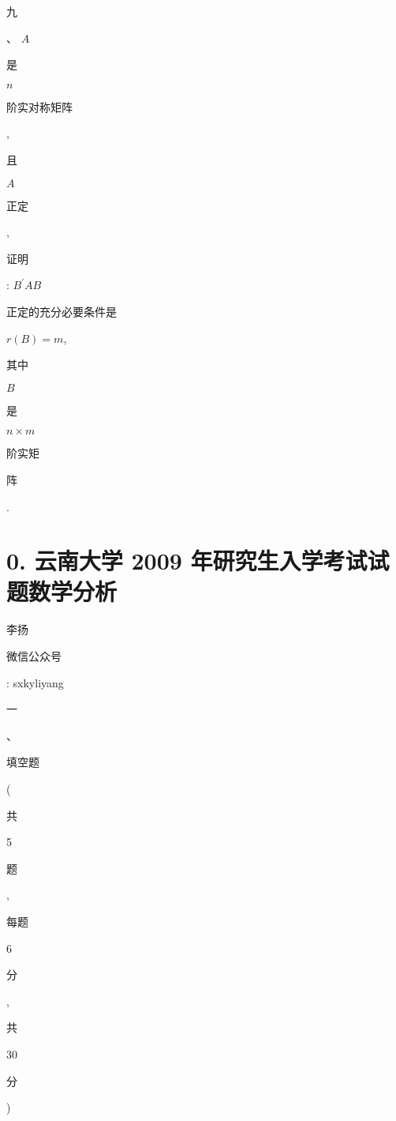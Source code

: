 \documentclass[10pt]{article}
\begin{document}
\begin{CJK}{UTF8}{mj}九\end{CJK}、 $A$ \begin{CJK}{UTF8}{mj}是\end{CJK} $n$ \begin{CJK}{UTF8}{mj}阶实对称矩阵\end{CJK}, \begin{CJK}{UTF8}{mj}且\end{CJK} $A$ \begin{CJK}{UTF8}{mj}正定\end{CJK}, \begin{CJK}{UTF8}{mj}证明\end{CJK}: $B^{\prime} A B$ \begin{CJK}{UTF8}{mj}正定的充分必要条件是\end{CJK} $r(B)=m$, \begin{CJK}{UTF8}{mj}其中\end{CJK} $B$ \begin{CJK}{UTF8}{mj}是\end{CJK} $n \times m$ \begin{CJK}{UTF8}{mj}阶实矩\end{CJK} \begin{CJK}{UTF8}{mj}阵\end{CJK}.

\section{0. 云南大学 2009 年研究生入学考试试题数学分析}
\begin{CJK}{UTF8}{mj}李扬\end{CJK}

\begin{CJK}{UTF8}{mj}微信公众号\end{CJK}: sxkyliyang

\begin{CJK}{UTF8}{mj}一\end{CJK}、\begin{CJK}{UTF8}{mj}填空题\end{CJK} (\begin{CJK}{UTF8}{mj}共\end{CJK} 5 \begin{CJK}{UTF8}{mj}题\end{CJK}, \begin{CJK}{UTF8}{mj}每题\end{CJK} 6 \begin{CJK}{UTF8}{mj}分\end{CJK}, \begin{CJK}{UTF8}{mj}共\end{CJK} 30 \begin{CJK}{UTF8}{mj}分\end{CJK})
\end{document}
